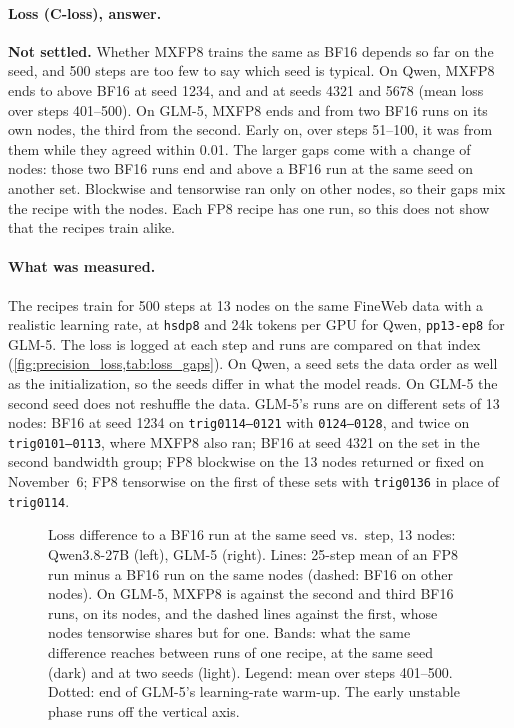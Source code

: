 \paragraph{Loss (C-loss), answer.} \textbf{Not settled.} Whether MXFP8 trains the same as BF16 depends so far on the seed, and 500 steps are too few to say which seed is typical. On Qwen, MXFP8 ends \TriLossSeedOneLo{} to \TriLossSeedOneHi{} above BF16 at seed 1234, and \TriLossSeedTwoLo{} and \TriLossSeedThreeLo{} at seeds 4321 and 5678 (mean loss over steps 401--500). On GLM-5, MXFP8 ends \TriLossGlmLast{} and \TriLossGlmMxThirdLast{} from two BF16 runs on its own nodes, the third \TriLossGlmThirdRepLast{} from the second. Early on, over steps 51--100, it was \TriLossGlmMxEarly{} from them while they agreed within 0.01. The larger gaps come with a change of nodes: those two BF16 runs end \TriLossGlmSameLast{} and \TriLossGlmThirdFirstLast{} above a BF16 run at the same seed on another set. Blockwise and tensorwise ran only on other nodes, so their gaps mix the recipe with the nodes. Each FP8 recipe has one run, so this does not show that the recipes train alike.

\paragraph{What was measured.} The recipes train for 500 steps at 13 nodes on the same FineWeb data with a realistic learning rate, at \texttt{hsdp8} and 24k tokens per GPU for Qwen, \texttt{pp13-ep8} for GLM-5. The loss is logged at each step and runs are compared on that index (\cref{fig:precision_loss,tab:loss_gaps}). On Qwen, a seed sets the data order as well as the initialization, so the seeds differ in what the model reads. On GLM-5 the second seed does not reshuffle the data. GLM-5's runs are on different sets of 13 nodes: BF16 at seed 1234 on \texttt{trig0114--0121} with \texttt{0124--0128}, and twice on \texttt{trig0101--0113}, where MXFP8 also ran; BF16 at seed 4321 on the set in the second bandwidth group; FP8 blockwise on the 13 nodes returned or fixed on November~6; FP8 tensorwise on the first of these sets with \texttt{trig0136} in place of \texttt{trig0114}.

\begin{figure}[h]
  \centering{}
  \caption{Loss difference to a BF16 run at the same seed vs.\ step, 13 nodes: Qwen3.8-27B (left), GLM-5 (right). Lines: 25-step mean of an FP8 run minus a BF16 run on the same nodes (dashed: BF16 on other nodes). On GLM-5, MXFP8 is against the second and third BF16 runs, on its nodes, and the dashed lines against the first, whose nodes tensorwise shares but for one. Bands: what the same difference reaches between runs of one recipe, at the same seed (dark) and at two seeds (light). Legend: mean over steps 401--500. Dotted: end of GLM-5's learning-rate warm-up. The early unstable phase runs off the vertical axis. }
  \label{fig:precision_loss}
\end{figure}

